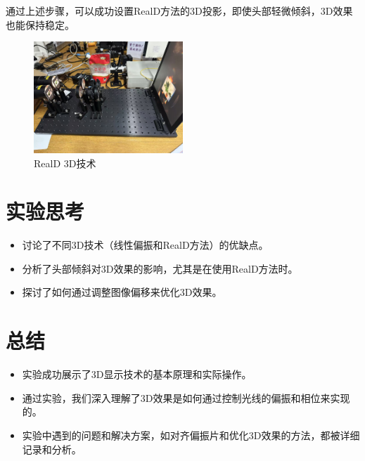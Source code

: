 \documentclass{ctexart}
\begin{document}
通过上述步骤，可以成功设置RealD方法的3D投影，即使头部轻微倾斜，3D效果也能保持稳定。
\begin{figure}[H]
    \centering
    \includegraphics[width=0.5\textwidth]{pictures/微信图片_20241212140323.jpg}
    \caption{RealD 3D技术}
\end{figure}

\section{实验思考}
\begin{itemize}
    \item 讨论了不同3D技术（线性偏振和RealD方法）的优缺点。
    \item 分析了头部倾斜对3D效果的影响，尤其是在使用RealD方法时。
    \item 探讨了如何通过调整图像偏移来优化3D效果。
\end{itemize}

\section{总结}
\begin{itemize}
    \item 实验成功展示了3D显示技术的基本原理和实际操作。
    \item 通过实验，我们深入理解了3D效果是如何通过控制光线的偏振和相位来实现的。
    \item 实验中遇到的问题和解决方案，如对齐偏振片和优化3D效果的方法，都被详细记录和分析。
\end{itemize}
\end{document}
